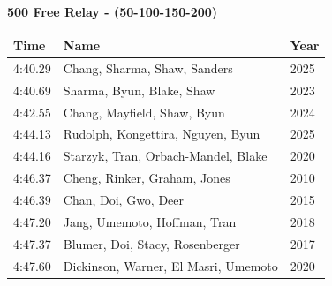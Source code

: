 \vspace{1.2em}
\noindent\begin{minipage}[t]{0.98\textwidth}
\centering
\textbf{\textcolor{teamprimary}{500 Free Relay - (50-100-150-200)}}\par
\vspace{0.5em}
\centering
\small
\renewcommand{\arraystretch}{1.0}
\setlength{\tabcolsep}{4pt}
\begin{tabular}{@{}p{4.5cm}p{8.5cm}p{2.5cm}@{}}
\toprule
\textbf{Time} & \textbf{Name} & \textbf{Year} \\
\midrule
4:40.29 & Chang, Sharma, Shaw, Sanders & 2025 \\
4:40.69 & Sharma, Byun, Blake, Shaw & 2023 \\
4:42.55 & Chang, Mayfield, Shaw, Byun & 2024 \\
4:44.13 & Rudolph, Kongettira, Nguyen, Byun & 2025 \\
4:44.16 & Starzyk, Tran, Orbach-Mandel, Blake & 2020 \\
4:46.37 & Cheng, Rinker, Graham, Jones & 2010 \\
4:46.39 & Chan, Doi, Gwo, Deer & 2015 \\
4:47.20 & Jang, Umemoto, Hoffman, Tran & 2018 \\
4:47.37 & Blumer, Doi, Stacy, Rosenberger & 2017 \\
4:47.60 & Dickinson, Warner, El Masri, Umemoto & 2020 \\
\bottomrule
\end{tabular}
\end{minipage}
\clearpage
